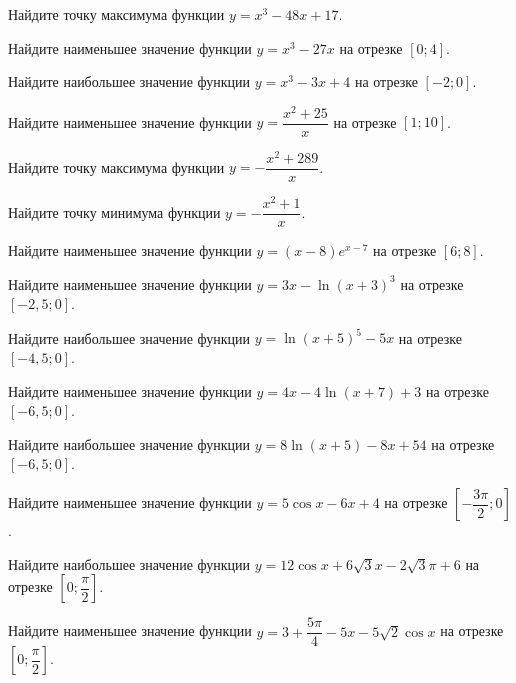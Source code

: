 
\begin{class}[number=1]
	\begin{listofex}
		\item Найдите точку максимума функции \(y=x^3-48x+17\).
		\item Найдите наименьшее значение функции \(y=x^3-27x\) на отрезке \([0;4]\).
		\item Найдите наибольшее значение функции \(y=x^3-3x+4\) на отрезке \([-2;0]\).
		\item Найдите наименьшее значение функции \(y=\dfrac{ x^2+25 }{ x }\) на отрезке \([1;10]\).
		\item Найдите точку максимума функции \(y=-\dfrac{ x^2+289 }{ x }\).
		\item Найдите точку минимума функции \(y=-\dfrac{ x^2+1 }{ x }\).
		\item Найдите наименьшее значение функции \(y=(x-8)e^{x-7}\) на отрезке \([6;8]\).
		\item Найдите наименьшее значение функции \(y=3x-\ln (x+3)^3\) на отрезке \([-2,5;0]\).
		\item Найдите наибольшее значение функции \(y=\ln (x+5)^5-5x\) на отрезке \([-4,5;0]\).
		\item Найдите наименьшее значение функции \(y=4x-4\ln (x+7)+3\) на отрезке \([-6,5;0]\).
		\item Найдите наибольшее значение функции \(y=8\ln (x+5)-8x+54\) на отрезке \([-6,5;0]\).
		\item Найдите наименьшее значение функции \(y=5 \cos x - 6x + 4 \) на отрезке \( \left[ -\dfrac{ 3\pi }{ 2 }; 0 \right] \).
		\item Найдите наибольшее значение функции \(y=12\cos x + 6\sqrt{3}x - 2 \sqrt{3} \pi +6 \) на отрезке \( \left[ 0; \dfrac{ \pi }{ 2 } \right] \).
		\item Найдите наименьшее значение функции \(y=3+\dfrac{ 5\pi }{ 4 } -5x - 5\sqrt{2} \cos x \) на отрезке \( \left[ 0; \dfrac{ \pi }{ 2 } \right] \).
		

\end{listofex}
\end{class}
